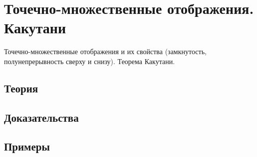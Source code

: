 
\section{Точечно-множественные отображения. Какутани}
\label{sec:2.4.11-set-valued-maps}

\begin{ticket}
Точечно-множественные отображения и их свойства (замкнутость, полунепрерывность сверху и снизу). Теорема Какутани.
\end{ticket}

\subsection*{Теория}

\subsection*{Доказательства}

\subsection*{Примеры}
